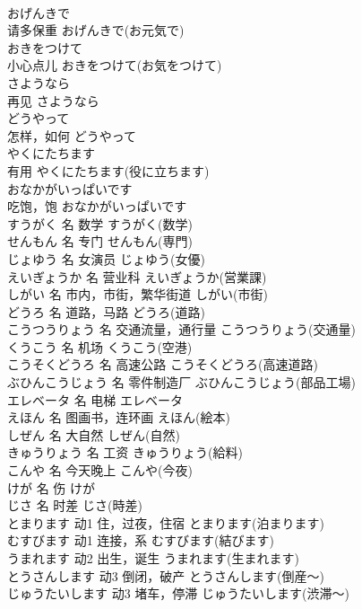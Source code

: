 \documentclass[8pt]{extreport}
\begin{document}
\begin{CJK}{UTF8}{min}
\\	おげんきで	
\\	请多保重	おげんきで(お元気で)	
\\	おきをつけて	
\\	小心点儿	おきをつけて(お気をつけて)	
\\	さようなら	
\\	再见	さようなら	
\\	どうやって	
\\	怎样，如何	どうやって	
\\	やくにたちます	
\\	有用	やくにたちます(役に立ちます)	
\\	おなかがいっぱいです	
\\	吃饱，饱	おなかがいっぱいです	
\\	すうがく	名	数学	すうがく(数学)	
\\	せんもん	名	专门	せんもん(専門)	
\\	じょゆう	名	女演员	じょゆう(女優)	
\\	えいぎょうか	名	营业科	えいぎょうか(営業課)	
\\	しがい	名	市内，市街，繁华街道	しがい(市街)	
\\	どうろ	名	道路，马路	どうろ(道路)	
\\	こうつうりょう	名	交通流量，通行量	こうつうりょう(交通量)	
\\	くうこう	名	机场	くうこう(空港)	
\\	こうそくどうろ	名	高速公路	こうそくどうろ(高速道路)	
\\	ぶひんこうじょう	名	零件制造厂	ぶひんこうじょう(部品工場)	
\\	エレベータ	名	电梯	エレベータ	
\\	えほん	名	图画书，连环画	えほん(絵本)	
\\	しぜん	名	大自然	しぜん(自然)	
\\	きゅうりょう	名	工资	きゅうりょう(給料)	
\\	こんや	名	今天晚上	こんや(今夜)	
\\	けが	名	伤	けが	
\\	じさ	名	时差	じさ(時差)	
\\	とまります	动1	住，过夜，住宿	とまります(泊まります)	
\\	むすびます	动1	连接，系	むすびます(結びます)	
\\	うまれます	动2	出生，诞生	うまれます(生まれます)	
\\	とうさんします	动3	倒闭，破产	とうさんします(倒産～)	
\\	じゅうたいします	动3	堵车，停滞	じゅうたいします(渋滞～)	

\end{CJK}
\end{document}
